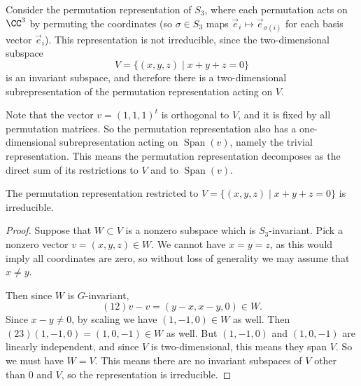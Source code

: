 \begin{example}
Consider the permutation representation of $S_3$, where each permutation acts on $\CC^3$ by permuting the coordinates (so $\sigma \in S_3$ maps $\vec{e}_i \mapsto \vec{e}_{\sigma(i)}$ for each basis vector $\vec{e}_i$). This representation is not irreducible, since the two-dimensional subspace \[V = \{(x, y, z) \mid x + y + z = 0 \}\] is an invariant subspace, and therefore there is a two-dimensional subrepresentation of the permutation representation acting on $V$. 

Note that the vector $v = (1, 1, 1)^t$ is orthogonal to $V$, and it is fixed by all permutation matrices. So the permutation representation also has a one-dimensional subrepresentation acting on $\operatorname{Span}(v)$, namely the trivial representation. This means the permutation representation decomposes as the direct sum of its restrictions to $V$ and to $\operatorname{Span}(v)$.



\end{example} 

\begin{proposition}
The permutation representation restricted to $V = \{(x, y, z) \mid x + y + z = 0\}$ is irreducible. 
\end{proposition}

\begin{proof}
Suppose that $W \subset V$ is a nonzero subspace which is $S_3$-invariant. Pick a nonzero vector $v = (x, y, z) \in W$. We cannot have $x = y = z$, as this would imply all coordinates are zero, so without loss of generality we may assume that $x \neq y$. 

Then since $W$ is $G$-invariant, \[(12)v - v = (y - x, x - y, 0) \in W.\] Since $x - y \neq 0$, by scaling we have $(1, -1, 0) \in W$ as well. Then $(23)(1, -1, 0) = (1, 0, -1) \in W$ as well. But $(1, -1, 0)$ and $(1, 0, -1)$ are linearly independent, and since $V$ is two-dimensional, this means they span $V$. So we must have $W = V$. This means there are no invariant subspaces of $V$ other than $0$ and $V$, so the representation is irreducible. 
\end{proof}

